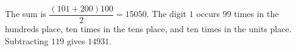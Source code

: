 The sum is $\dfrac{(101+200)100}{2}=15050$. The digit $1$ occurs $99$ times in the hundreds place, ten times in the tens place, and ten times in the units place. Subtracting $119$ gives $\boxed{14931}$.
